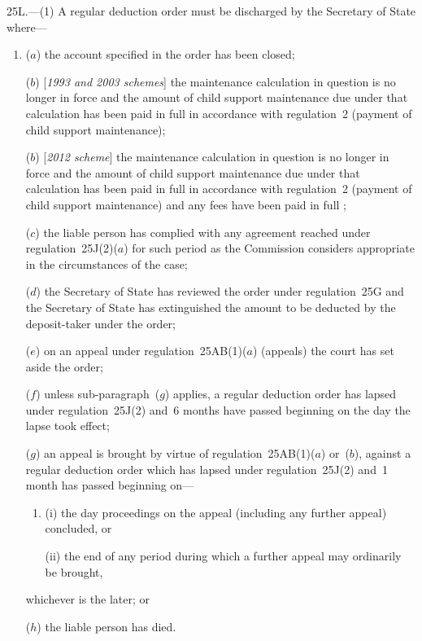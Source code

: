 \documentclass[12pt,a4paper]{article}
\begin{document}
25L.---(1)  A regular deduction order must be discharged by the 
Secretary of State  %
where—
\begin{enumerate}\item[]
($a$) the account specified in the order has been closed;

($b$) [\emph{1993 and 2003 schemes}] the maintenance calculation in question is no longer in force and the amount of child support maintenance due under that calculation has been paid in full in accordance with regulation~2 (payment of child support maintenance);

($b$) [\emph{2012 scheme}] the maintenance calculation in question is no longer in force and the amount of child support maintenance due under that calculation has been paid in full in accordance with regulation~2 (payment of child support maintenance)
and any fees have been paid in full%
;

($c$) the liable person has complied with any agreement reached under regulation~25J(2)($a$)  for such period as the Commission considers appropriate in the circumstances of the case;

($d$) the 
Secretary of State  %
has reviewed the order under regulation~25G and 
the Secretary of State  %
has extinguished the amount to be deducted by the deposit-taker under the order;

($e$) on an appeal under regulation~25AB(1)($a$)  (appeals) the court has set aside the order;

($f$) unless sub-paragraph~($g$)  applies, a regular deduction order has lapsed under regulation~25J(2) and~6 months have passed beginning on the day the lapse took effect;

\begin{sloppypar}
($g$) an appeal is brought by virtue of regulation~25AB(1)($a$)  or~($b$), against a regular deduction order which has lapsed under regulation~25J(2) and~1 month has passed beginning on—
\end{sloppypar}
\begin{enumerate}\item[]
(i) the day proceedings on the appeal (including any further appeal) concluded, or

(ii) the end of any period during which a further appeal may ordinarily be brought,
\end{enumerate}
whichever is the later; or

($h$) the liable person has died.
\end{enumerate}
\end{document}
